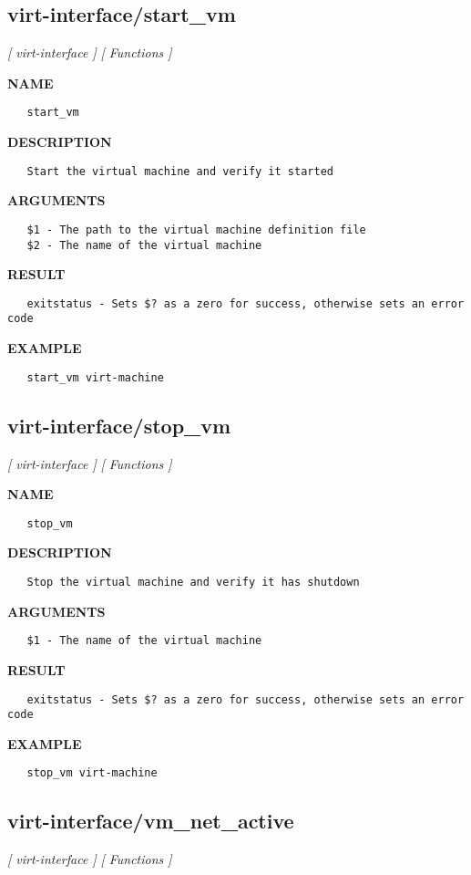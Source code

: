 \subsection{virt-interface/start\_vm}
\textsl{[ virt-interface ]}
\textsl{[ Functions ]}

\label{ch:robo55}
\label{ch:virt_interface_start_vm}
\textbf{NAME}
\begin{verbatim}
   start_vm
\end{verbatim}
\textbf{DESCRIPTION}
\begin{verbatim}
   Start the virtual machine and verify it started
\end{verbatim}
\textbf{ARGUMENTS}
\begin{verbatim}
   $1 - The path to the virtual machine definition file
   $2 - The name of the virtual machine
\end{verbatim}
\textbf{RESULT}
\begin{verbatim}
   exitstatus - Sets $? as a zero for success, otherwise sets an error code
\end{verbatim}
\textbf{EXAMPLE}
\begin{verbatim}
   start_vm virt-machine
\end{verbatim}
\newpage
\subsection{virt-interface/stop\_vm}
\textsl{[ virt-interface ]}
\textsl{[ Functions ]}

\label{ch:robo56}
\label{ch:virt_interface_stop_vm}
\textbf{NAME}
\begin{verbatim}
   stop_vm
\end{verbatim}
\textbf{DESCRIPTION}
\begin{verbatim}
   Stop the virtual machine and verify it has shutdown
\end{verbatim}
\textbf{ARGUMENTS}
\begin{verbatim}
   $1 - The name of the virtual machine
\end{verbatim}
\textbf{RESULT}
\begin{verbatim}
   exitstatus - Sets $? as a zero for success, otherwise sets an error code
\end{verbatim}
\textbf{EXAMPLE}
\begin{verbatim}
   stop_vm virt-machine
\end{verbatim}
\newpage
\subsection{virt-interface/vm\_net\_active}
\textsl{[ virt-interface ]}
\textsl{[ Functions ]}

